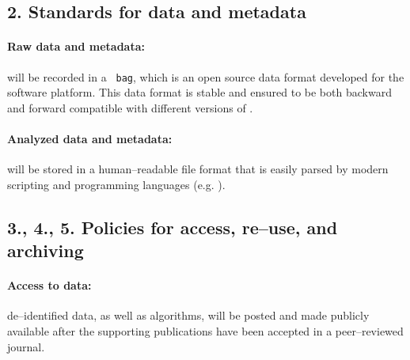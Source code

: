 \documentclass[11pt]{article}
\begin{document}
\subsection*{2. Standards for data and metadata}

\paragraph{Raw data and metadata:}
will be recorded in a {\tt{\ROS} bag}, which is an open source data format developed for the {\tt{\ROS}} software platform.
This data format is stable and ensured to be both backward and forward compatible with different versions of {\tt{\ROS}}.

\paragraph{Analyzed data and metadata:}
will be stored in a human--readable {\tt\JSON} file format that is easily parsed by modern scripting and programming languages (e.g. {\tt\Python}).

\subsection*{3., 4., 5. Policies for access, re--use, and archiving}

\paragraph{Access to data:}
de--identified data, as well as algorithms, will be posted and made publicly available after the supporting publications have been accepted in a peer--reviewed journal.

\end{document}
